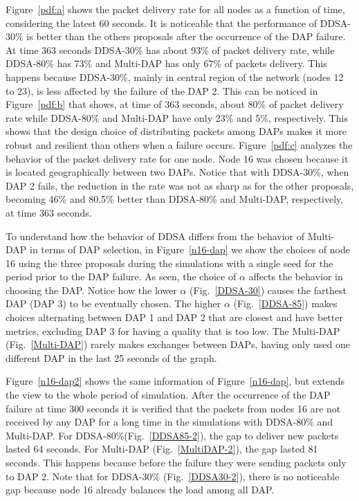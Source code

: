 \documentclass[conference]{IEEEtran}
\begin{document}
Figure~\ref{pdf:a} shows the packet delivery rate for all nodes as a function of time, considering the latest 60 seconds. It is noticeable that the performance of DDSA-30\% is better than the others proposals after the occurrence of the DAP failure. At time 363 seconds DDSA-30\% has about 93\% of packet delivery rate, while DDSA-80\% has 73\% and Multi-DAP has only 67\% of packets delivery. 
This happens because DDSA-30\%, mainly in central region of the network (nodes 12 to 23), is less affected by the failure of the DAP 2. This can be noticed in Figure~\ref{pdf:b} that shows, at time of 363 seconds, about 80\% of packet delivery rate while DDSA-80\% and Multi-DAP have only 23\% and 5\%, respectively. This shows that the design choice of distributing packets among DAPs makes it more robust and resilient than others when a failure occurs. 
Figure~\ref{pdf:c}  analyzes the behavior of the packet delivery rate for one node. Node 16 was chosen because it is located geographically between two DAPs. Notice that with DDSA-30\%, when DAP 2 fails, the reduction in the rate was not as sharp as for the other proposals, becoming 46\% and 80.5\% better than DDSA-80\% and Multi-DAP, respectively, at time 363 seconds. 



To understand how the behavior of DDSA differs from the behavior of Multi-DAP in terms of DAP selection, in Figure~\ref{n16-dap} we show the choices of node 16 using the three proposals during the simulations with a single seed for the period prior to the DAP failure. 
As seen, the choice of $\alpha$ affects the behavior in choosing the DAP. Notice how the lower $\alpha$ (Fig.~\ref{DDSA-30}) causes the farthest DAP (DAP 3) to be eventually chosen.
The higher $\alpha$ (Fig.~\ref{DDSA-85}) makes choices alternating between DAP 1 and DAP 2 that are closest and have better metrics, excluding DAP 3 for having a quality that is too low.
The Multi-DAP (Fig.~\ref{Multi-DAP}) rarely makes exchanges between DAPs, having only used one different DAP in the last 25 seconds of the graph.


Figure~\ref{n16-dap2} shows the same information of Figure~\ref{n16-dap}, but extends the view to the whole period of simulation. 
After the occurrence of the DAP failure at time 300 seconds it is verified that the packets from nodes 16 are not received by any DAP for a long time in the simulations with DDSA-80\% and Multi-DAP.
For DDSA-80\%(Fig.~\ref{DDSA85-2}), the gap to deliver new packets lasted 64 seconds. For Multi-DAP (Fig.~\ref{MultiDAP-2}), the gap lasted 81 seconds. This happens because before the failure they were sending packets only to DAP 2. Note that for DDSA-30\% (Fig.~\ref{DDSA30-2}), there is no noticeable gap because node 16 already balances the load among all DAP.
\end{document}
